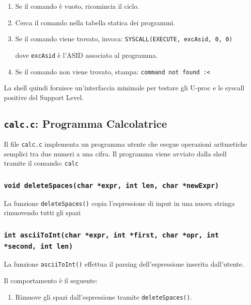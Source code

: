 \documentclass[a4paper,12pt]{article}
\begin{document}
\begin{enumerate}
\begin{enumerate}
    \item Se il comando è vuoto, ricomincia il ciclo.

    \item Cerca il comando nella tabella statica dei programmi.

    \item Se il comando viene trovato, invoca:
        \texttt{SYSCALL(EXECUTE, excAsid, 0, 0)}

    dove \texttt{excAsid} è l'ASID associato al programma.

    \item Se il comando non viene trovato, stampa:
        \texttt{command not found :<}

\end{enumerate}

La shell quindi fornisce un'interfaccia minimale per testare gli U-proc e le syscall positive del Support Level.

\vspace{0.5cm}
\subsection{\texttt{calc.c}: Programma Calcolatrice}

Il file \texttt{calc.c} implementa un programma utente che esegue operazioni aritmetiche semplici tra due numeri a una cifra. Il programma viene avviato dalla shell tramite il comando: \texttt{calc}

\vspace{0.3cm}
\subsubsection{\texttt{void deleteSpaces(char *expr, int len, char *newExpr)}}

La funzione \texttt{deleteSpaces()} copia l'espressione di input in una nuova stringa rimuovendo tutti gli spazi

\vspace{0.3cm}
\subsubsection{\texttt{int asciiToInt(char *expr, int *first, char *opr, int *second, int len)}}

La funzione \texttt{asciiToInt()} effettua il parsing dell'espressione inserita dall'utente.

Il comportamento è il seguente:

\begin{enumerate}
    \item Rimuove gli spazi dall'espressione tramite \texttt{deleteSpaces()}.


\end{enumerate}
\end{enumerate}
\end{document}
